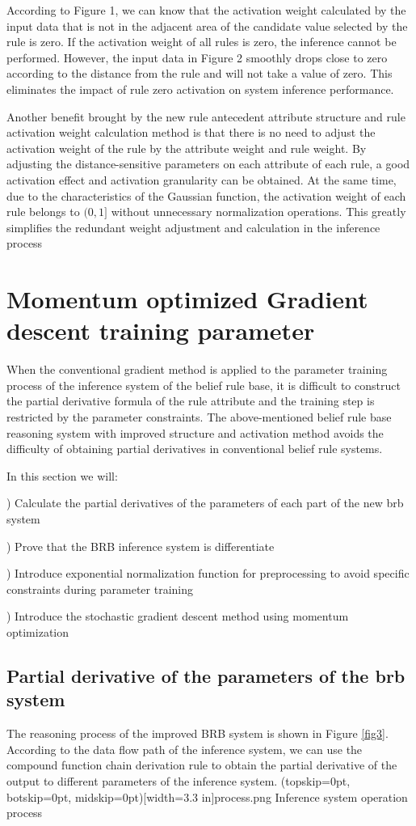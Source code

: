 \documentclass{ieeeaccess}
\begin{document}
According to Figure 1, we can know that the activation weight calculated by the input data that is not in the adjacent area of the candidate value selected by the rule is zero.
If the activation weight of all rules is zero, the inference cannot be performed.
However, the input data in Figure 2 smoothly drops close to zero according to the distance from the rule and will not take a value of zero.
This eliminates the impact of rule zero activation on system inference performance.

Another benefit brought by the new rule antecedent attribute structure and rule activation weight calculation method is that
there is no need to adjust the activation weight of the rule by the attribute weight and rule weight.
By adjusting the distance-sensitive parameters on each attribute of each rule, a good activation effect and activation granularity can be obtained.
At the same time, due to the characteristics of the Gaussian function, the activation weight of each rule belongs to $(0, 1]$ without unnecessary normalization operations.
This greatly simplifies the redundant weight adjustment and calculation in the inference process


\section{Momentum optimized Gradient descent training parameter}
When the conventional gradient method is applied to the parameter training process of the inference system of the belief rule base,
it is difficult to construct the partial derivative formula of the rule attribute and the training step is restricted by the parameter constraints.
The above-mentioned belief rule base reasoning system with improved structure and activation method avoids the difficulty of obtaining partial derivatives in conventional belief rule systems.

In this section we will:

) Calculate the partial derivatives of the parameters of each part of the new brb system

) Prove that the BRB inference system is differentiate

) Introduce exponential normalization function for preprocessing to avoid specific constraints during parameter training

) Introduce the stochastic gradient descent method using momentum optimization


\subsection{Partial derivative of the parameters of the brb system}
The reasoning process of the improved BRB system is shown in Figure \ref{fig3}.
According to the data flow path of the inference system, we can use the compound function chain derivation rule to obtain the partial derivative of the output to different parameters of the inference system.
\Figure[!t](topskip=0pt, botskip=0pt, midskip=0pt)[width=3.3 in]{process.png}
{Inference system operation process\label{fig3}}
\end{document}
